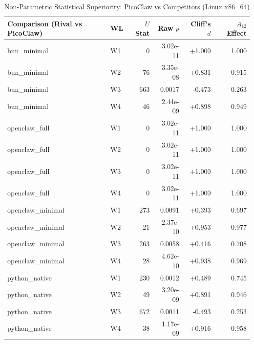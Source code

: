 \begin{table}[t]
\centering\small
\caption{Non-Parametric Statistical Superiority: PicoClaw vs Competitors (Linux x86_64)}
\label{tab:linux_stat_tests}
\begin{tabular}{llrrrr}
\toprule
Comparison (Rival vs PicoClaw) & WL & $U$ Stat & Raw $p$ & Cliff's $d$ & $A_{12}$ Effect \\
\midrule
bun\_minimal & W1 & 0 & 3.02e-11 & +1.000 & 1.000 \\
bun\_minimal & W2 & 76 & 3.35e-08 & +0.831 & 0.915 \\
bun\_minimal & W3 & 663 & 0.0017 & -0.473 & 0.263 \\
bun\_minimal & W4 & 46 & 2.44e-09 & +0.898 & 0.949 \\
openclaw\_full & W1 & 0 & 3.02e-11 & +1.000 & 1.000 \\
openclaw\_full & W2 & 0 & 3.02e-11 & +1.000 & 1.000 \\
openclaw\_full & W3 & 0 & 3.02e-11 & +1.000 & 1.000 \\
openclaw\_full & W4 & 0 & 3.02e-11 & +1.000 & 1.000 \\
openclaw\_minimal & W1 & 273 & 0.0091 & +0.393 & 0.697 \\
openclaw\_minimal & W2 & 21 & 2.37e-10 & +0.953 & 0.977 \\
openclaw\_minimal & W3 & 263 & 0.0058 & +0.416 & 0.708 \\
openclaw\_minimal & W4 & 28 & 4.62e-10 & +0.938 & 0.969 \\
python\_native & W1 & 230 & 0.0012 & +0.489 & 0.745 \\
python\_native & W2 & 49 & 3.20e-09 & +0.891 & 0.946 \\
python\_native & W3 & 672 & 0.0011 & -0.493 & 0.253 \\
python\_native & W4 & 38 & 1.17e-09 & +0.916 & 0.958 \\
\bottomrule
\end{tabular}
\end{table}
